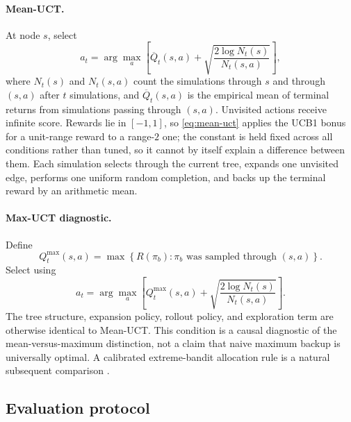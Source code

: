 \documentclass[11pt, a4paper]{article}
\theoremstyle{definition}
\begin{document}
\paragraph{Mean-UCT.}
At node \(s\), select
\begin{equation}
    a_t
    =
    \arg\max_a
    \left[
        \overline Q_t(s,a)
        +
        \sqrt{
            \frac{2\log N_t(s)}
                 {N_t(s,a)}
        }
    \right],
    \label{eq:mean-uct}
\end{equation}
where \(N_t(s)\) and \(N_t(s,a)\) count the simulations through \(s\) and
through \((s,a)\) after \(t\) simulations, and \(\overline Q_t(s,a)\) is the
empirical mean of terminal returns from simulations passing through
\((s,a)\).  Unvisited actions receive infinite score.  Rewards lie in
\([-1,1]\), so \eqref{eq:mean-uct} applies the UCB1 bonus for a unit-range
reward to a range-\(2\) one; the constant is held fixed across all conditions
rather than tuned, so it cannot by itself explain a difference between them.
Each simulation selects through the current tree, expands one
unvisited edge, performs one uniform random completion, and backs up the
terminal reward by an arithmetic mean.

\paragraph{Max-UCT diagnostic.}
Define
\begin{equation}
    Q_t^{\max}(s,a)
    =
    \max
    \left\{
        R(\pi_b):
        \pi_b\text{ was sampled through }(s,a)
    \right\}.
    \label{eq:qmax}
\end{equation}
Select using
\begin{equation}
    a_t
    =
    \arg\max_a
    \left[
        Q_t^{\max}(s,a)
        +
        \sqrt{
            \frac{2\log N_t(s)}
                 {N_t(s,a)}
        }
    \right].
    \label{eq:max-uct}
\end{equation}
The tree structure, expansion policy, rollout policy, and exploration term
are otherwise identical to Mean-UCT.  This condition is a causal diagnostic
of the mean-versus-maximum distinction, not a claim that naive maximum backup
is universally optimal.  A calibrated extreme-bandit allocation rule is a
natural subsequent comparison \cite{huang2025improving}.

\subsection{Evaluation protocol}
\end{document}
